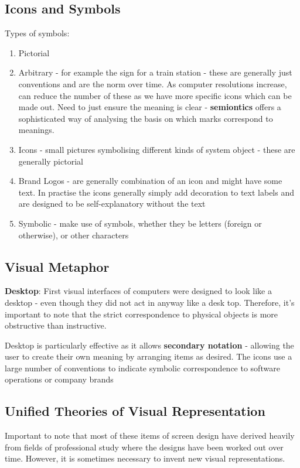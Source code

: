 \documentclass{article}
\begin{document}
\subsection{Icons and Symbols}
Types of symbols:
\begin{enumerate}
    \item Pictorial
    \item Arbitrary - for example the sign for a train station - these are generally just conventions and are the norm over time. As computer resolutions increase, can reduce the number of these as we have more specific icons which can be made out. Need to just ensure the meaning is clear - \textbf{semiontics} offers a sophisticated way of analysing the basis on which marks correspond to meanings.
    \item Icons - small pictures symbolising different kinds of system object - these are generally pictorial
    \item Brand Logos - are generally combination of an icon and might have some text. In practise the icons generally simply add decoration to text labels and are designed to be self-explanatory without the text
    \item Symbolic - make use of symbols, whether they be letters (foreign or otherwise), or other characters
\end{enumerate}

\subsection{Visual Metaphor}
\textbf{Desktop}: First visual interfaces of computers were designed to look like a desktop - even though they did not act in anyway like a desk top. Therefore, it's important to note that the strict correspondence to physical objects is more obstructive than instructive. 

Desktop is particularly effective as it allows \textbf{secondary notation} - allowing the user to create their own meaning by arranging items as desired. The icons use a large number of conventions to indicate symbolic correspondence to software operations or company brands

\subsection{Unified Theories of Visual Representation}
Important to note that most of these items of screen design have derived heavily from fields of professional study where the designs have been worked out over time. However, it is sometimes necessary to invent new visual representations.
\end{document}
